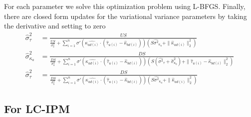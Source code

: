 \documentclass{article}
\begin{document}
For each parameter we solve this optimization problem using L-BFGS. Finally, there are closed form updates for the variational variance parameters by taking the derivative and setting to zero
\begin{align*}
\hat{\sigma}^2_\tau & = \frac{US}{\frac{US}{\sigma^2_x} + \sum_{i=1}^n \sigma'(\hat{\kappa_{ad(i)}} \cdot (\hat{\tau}_{u(i)} - \hat{\kappa}_{bd(i)}))(S\hat{\sigma^2}_{\kappa_a} + \|\hat{\kappa}_{ad(i)}\|_2^2)}\\
\hat{\sigma}^2_{\kappa_a} & = \frac{DS}{\frac{DS}{\sigma^2_a} + \sum_{i=1}^n \sigma'(\hat{\kappa_{ad(i)}} \cdot (\hat{\tau}_{u(i)} - \hat{\kappa}_{bd(i)}))(S(\hat{\sigma^2}_{\tau} + \hat{\sigma}^2_{\kappa_b}) + \|\hat{\tau}_{u(i)} - \hat{\kappa}_{bd(i)}\|_2^2)}\\
\hat{\sigma}^2_\tau & = \frac{DS}{\frac{DS}{\sigma^2_b} + \sum_{i=1}^n \sigma'(\hat{\kappa_{ad(i)}} \cdot (\hat{\tau}_{u(i)} - \hat{\kappa}_{bd(i)}))(S\hat{\sigma^2}_{\kappa_a} + \|\hat{\kappa}_{ad(i)}\|_2^2)}
\end{align*}


\subsection{For LC-IPM}
\label{lcipmvi}
\end{document}
